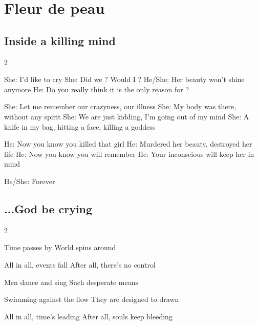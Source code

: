 \documentclass{article}
\newenvironment{album}[1]%
{%
  \section*{#1}
}%
{%
}
\newenvironment{song}[1]%
{%
  \subsection*{\textbf{#1}}
  \begin{multicols*}{2}
}%
{%
  \end{multicols*}
  \newpage
}
\newenvironment{couplet} %
{%
  \verbatim
}%
{% end code
  \endverbatim
}
\newenvironment{refrain} %
{%
  \verbatim
}%
{% end code
  \endverbatim
}
\newenvironment{pont} %
{%
  \verbatim
}%
{% end code
  \endverbatim
}
\begin{document}
\begin{album}{Fleur de peau}
\begin{song}{Inside a killing mind}
\begin{refrain}
She: I’d like to cry
She: Did we ? Would I ?
He/She: Her beauty won’t shine anymore
He: Do you really think it is the only reason for ?
\end{refrain}
\begin{pont}
She: Let me remember our crazyness, our illness
She: My body was there, without any spirit
She: We are just kidding, I’m going out of my mind
She: A knife in my bag, hitting a face, killing a goddess
\end{pont}
\begin{couplet}
He: Now you know you killed that girl
He: Murdered her beauty, destroyed her life
He: Now you know you will remember
He: Your inconscious will keep her in mind

He/She: Forever
\end{couplet}

\end{song}


\begin{song}{...God be crying}
\begin{couplet}
Time passes by
World spins around
\end{couplet}  
\begin{refrain}
All in all, events fall
After all, there’s no control  
\end{refrain}
\begin{couplet}
Men dance and sing
Such desperate means

Swimming against the flow
They are designed to drawn
\end{couplet}
\begin{refrain}
All in all, time’s leading
After all, souls keep bleeding


\end{refrain}
\end{song}
\end{album}
\end{document}
